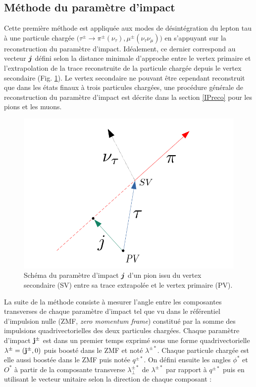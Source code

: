 \subsection{Méthode du paramètre d'impact}
\label{IPmethod}

Cette première méthode est appliquée aux modes de désintégration du lepton tau à une particule chargée $\bigl(\tau^{\pm}\rightarrow\pi^{\pm}(\nu_{\tau}),\mu^{\pm}(\nu_{\tau}\nu_{\mu})\bigr)$ en s'appuyant sur la reconstruction du paramètre d'impact. Idéalement, ce dernier correspond au vecteur $\vb*{j}$ défini selon la distance minimale d'approche entre le vertex primaire et l'extrapolation de la trace reconstruite de la particule chargée depuis le vertex secondaire (Fig. \ref{IP}). Le vertex secondaire ne pouvant être cependant reconstruit que dans les états finaux à trois particules chargées, une procédure générale de reconstruction du paramètre d'impact est décrite dans la section \ref{IPreco} pour les pions et les muons. \\

\begin{figure}[!ht]
\centering
    \includegraphics[scale=0.4]{Chapitre6/Images/IP.png} 
    \caption{Schéma du paramètre d'impact $\vb*{j}$ d'un pion issu du vertex secondaire (SV) entre sa trace extrapolée et le vertex primaire (PV).}
    \label{IP}
\end{figure}

La suite de la méthode consiste à mesurer l'angle entre les composantes transverses de chaque paramètre d'impact tel que vu dans le référentiel d'impulsion nulle (ZMF, \textit{zero momentum frame}) constitué par la somme des impulsions quadrivectorielles des deux particules chargées. Chaque paramètre d'impact $\vb{j}^{\pm}$ est dans un premier temps exprimé sous une forme quadrivectorielle $\lambda^{\pm}=(\vb{j}^{\pm},0)$ puis boosté dans le ZMF et noté $\lambda^{\pm*}$. Chaque particule chargée est elle aussi boostée dans le ZMF puis notée $q^{\pm*}$. On défini ensuite les angles $\phi^*$ et $O^*$ à partir de la composante transverse $\lambda_{\perp}^{\pm*}$ de $\lambda^{\pm*}$ par rapport à $q^{\pm*}$ puis en utilisant le vecteur unitaire selon la direction de chaque composant :

